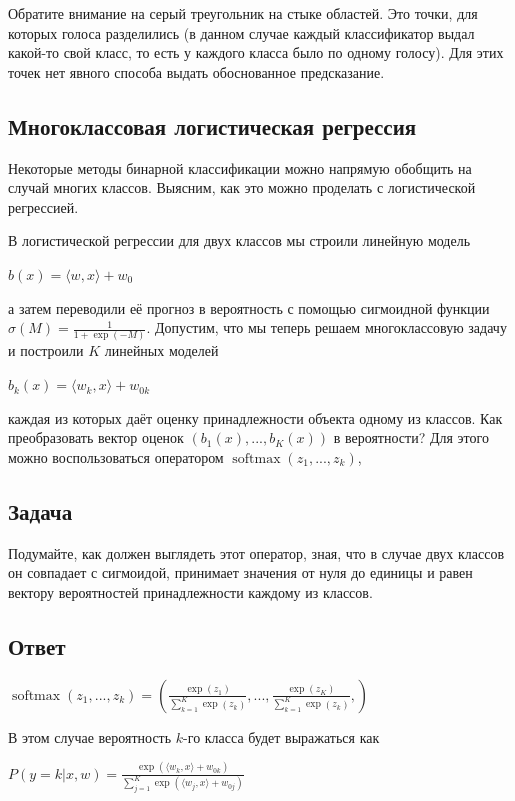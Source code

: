 Обратите внимание на серый треугольник на стыке областей. Это точки, для которых голоса разделились (в данном случае каждый классификатор выдал какой-то свой класс, то есть у каждого класса было по одному голосу). Для этих точек нет явного способа выдать обоснованное предсказание.

\subsection{Многоклассовая логистическая регрессия}

Некоторые методы бинарной классификации можно напрямую обобщить на случай многих классов. Выясним, как это можно проделать с логистической регрессией.

В логистической регрессии для двух классов мы строили линейную модель

$b(x) = \langle w, x \rangle+w_0$

а затем переводили её прогноз в вероятность с помощью сигмоидной функции $\sigma(M) = \frac{1}{1+\operatorname{exp}(-M)}$. Допустим, что мы теперь решаем многоклассовую задачу и построили $K$ линейных моделей

$b_k(x) = \langle w_k, x \rangle+w_{0k}$

каждая из которых даёт оценку принадлежности объекта одному из классов. Как преобразовать вектор оценок $(b_1(x),...,b_K(x))$ в вероятности? Для этого можно воспользоваться оператором $\operatorname{softmax}(z_1,...,z_k)$,

\subsection*{Задача}

Подумайте, как должен выглядеть этот оператор, зная, что в случае двух классов он совпадает с сигмоидой, принимает значения от нуля до единицы и равен вектору вероятностей принадлежности каждому из классов.

\subsection*{Ответ}

$\operatorname{softmax}(z_1,...,z_k) = \left( \frac{\exp{(z_1)}}{\sum^K_{k=1}\exp{(z_k)}}, ..., \frac{\exp{(z_K)}}{\sum^K_{k=1}\exp{(z_k)}}, \right)$ \newline

В этом случае вероятность $k$-го класса будет выражаться как

$P(y=k|x,w) = \frac{\exp{(\langle w_k, x \rangle+w_{0k})}}{\sum^K_{j=1}\exp{(\langle w_j, x \rangle+w_{0j})}}$

